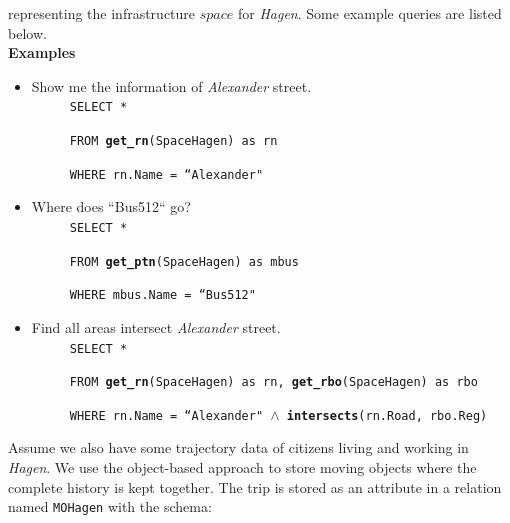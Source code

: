 representing the infrastructure $space$ for \textit{Hagen}. Some example queries are listed below.\\

\textbf{Examples}\\
\begin{itemize}
 \item Show me the information of \textit{Alexander} street.  \\

$\hspace{1cm}$ \texttt{SELECT *}

$\hspace{1cm}$ \texttt{FROM \textbf{get\_rn}(SpaceHagen) as rn}

$\hspace{1cm}$ \texttt{WHERE rn.Name = ``Alexander"} \\

\item Where does ``Bus512`` go?  \\

$\hspace{1cm}$ \texttt{SELECT *}

$\hspace{1cm}$ \texttt{FROM \textbf{get\_ptn}(SpaceHagen) as mbus}

$\hspace{1cm}$ \texttt{WHERE mbus.Name = ``Bus512"} \\

\item Find all areas intersect \textit{Alexander} street.  \\

$\hspace{1cm}$ \texttt{SELECT *} 

$\hspace{1cm}$ \texttt{FROM \textbf{get\_rn}(SpaceHagen) as rn, \textbf{get\_rbo}(SpaceHagen) as rbo}

$\hspace{1cm}$ \texttt{WHERE rn.Name = ``Alexander" $\wedge$ \textbf{intersects}(rn.Road, rbo.Reg)} \\

\end{itemize}

Assume we also have some trajectory data of citizens living and working in \textit{Hagen}. We use the object-based approach \cite{DBG2009} to store moving objects where the complete history is kept together. The trip is 
stored as an attribute in a relation named \texttt{MOHagen} with the schema: \\


